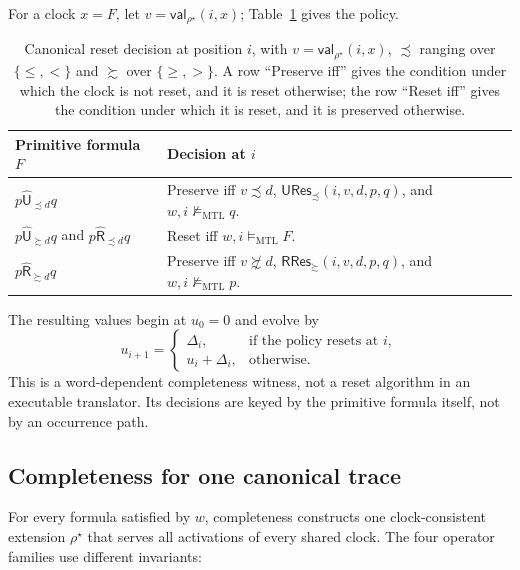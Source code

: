 \documentclass{ieeeaccess}
\newcommand{\satM}{\models_{\mathrm{MTL}}}
\newcommand{\hUntil}{\mathbin{\widehat{\mathsf{U}}}}
\newcommand{\hRelease}{\mathbin{\widehat{\mathsf{R}}}}
\newcommand{\CVal}{\mathsf{val}}
\begin{document}
For a clock $x=F$, let $v=\CVal_{\rho^\star}(i,x)$; Table~\ref{tab:canonical-policy} gives the
policy.
\begin{table}[t]
\centering
\caption{Canonical reset decision at position $i$, with
$v=\CVal_{\rho^\star}(i,x)$, $\precsim$ ranging over $\{\le,<\}$ and
$\succsim$ over $\{\ge,>\}$. A row ``Preserve iff'' gives the condition under
which the clock is not reset, and it is reset otherwise; the row ``Reset iff''
gives the condition under which it is reset, and it is preserved otherwise.}
\label{tab:canonical-policy}
\begin{tabular}{@{}p{}p{}@{}}
\toprule
Primitive formula $F$ & Decision at $i$\\
\midrule
$p\hUntil_{\precsim d}q$ &
Preserve iff $v\precsim d$, $\mathsf{URes}_{\precsim}(i,v,d,p,q)$, and
$w,i\not\satM q$.\\
$p\hUntil_{\succsim d}q$ and $p\hRelease_{\precsim d}q$ &
Reset iff $w,i\satM F$.\\
$p\hRelease_{\succsim d}q$ &
Preserve iff $v\not\succsim d$, $\mathsf{RRes}_{\succsim}(i,v,d,p,q)$, and
$w,i\not\satM p$.\\
\bottomrule
\end{tabular}
\end{table}
The resulting values begin at $u_0=0$ and evolve by
\[
u_{i+1}=
\begin{cases}
\Delta_i,&\text{if the policy resets at }i,\\
u_i+\Delta_i,&\text{otherwise.}
\end{cases}
\]
This is a word-dependent completeness witness, not a reset algorithm in an
executable translator. Its decisions are keyed by the primitive formula
itself, not by an occurrence path.

\subsection{Completeness for one canonical trace}
\label{subsec:primitive-completeness}
For every formula satisfied by $w$, completeness constructs one clock-consistent
extension $\rho^\star$ that serves all activations of every shared clock.
The four operator families use different invariants:
\end{document}
